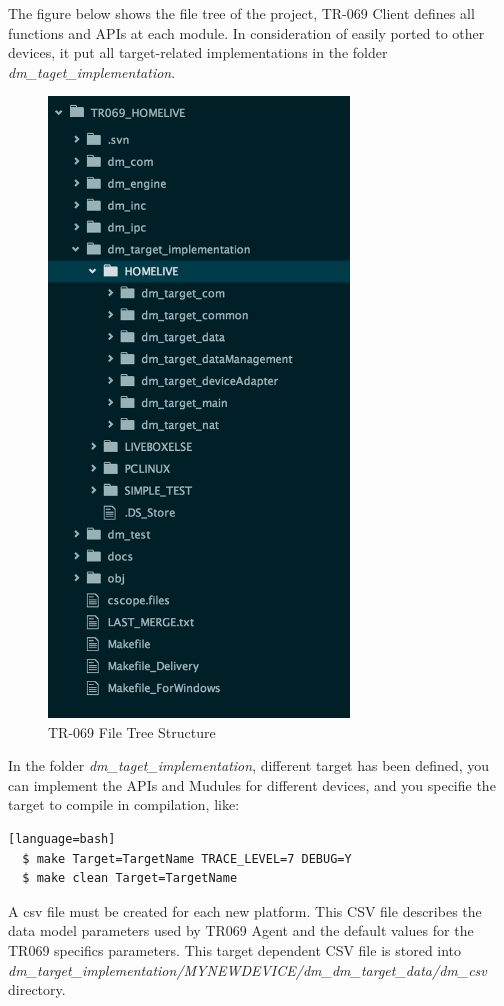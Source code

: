 The figure below shows the file tree of the project, TR-069 Client defines all functions and APIs at each module. In consideration of easily ported to other devices, it put all target-related implementations in the folder \textit{dm_taget_implementation}.

\begin{figure}[htbp]
	\centering
		\includegraphics[width=8cm]{Figures/tr069_files.png}
	\caption[TR-069 File Tree Structure]{TR-069 File Tree Structure}
	\label{fig:tr069file}
\end{figure}

In the folder \textit{dm_taget_implementation}, different target has been defined, you can implement the APIs and Mudules for different devices, and you specifie the target to compile in compilation, like:

\begin{lstlisting}[style=DOS][language=bash]
  $ make Target=TargetName TRACE_LEVEL=7 DEBUG=Y
  $ make clean Target=TargetName
\end{lstlisting}

A csv file must be created for each new platform. This CSV file describes the data model parameters used by TR069 Agent and the default values for the TR069 specifics parameters. This target dependent CSV file is stored into \textit{dm_target_implementation/MYNEWDEVICE/dm_dm_target_data/dm_csv} directory.

